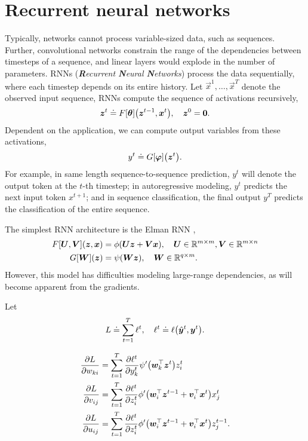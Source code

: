 \section{Recurrent neural networks}

Typically, networks cannot process variable-sized data, such as sequences. Further, convolutional
networks constrain the range of the dependencies between timesteps of a sequence, and linear layers
would explode in the number of parameters. RNNs (\textit{\textbf{R}ecurrent \textbf{N}eural
    \textbf{N}etworks}) process the data sequentially, where each timestep depends on its entire
history. Let $\vec{x}^1, \ldots, \vec{x}^T$ denote the observed input sequence, RNNs compute the
sequence of activations recursively, \[
    \vec{z}^t \doteq F[\vec{\theta}]\lft( \vec{z}^{t-1}, \vec{x}^t \rgt), \quad \vec{z}^0 = \vec{0}.
\]
Dependent on the application, we can compute output variables from these activations, \[
    y^t \doteq G[\vec{\varphi}]\lft( \vec{z}^t \rgt).
\]
For example, in same length sequence-to-sequence prediction, $y^t$ will denote the output token at
the $t$-th timestep; in autoregressive modeling, $y^t$ predicts the next input token $x^{t+1}$; and
in sequence classification, the final output $y^T$ predicts the classification of the entire
sequence.

The simplest RNN architecture is the Elman RNN \citep{elman1990finding},
\begin{align*}
    F[\bm{U}, \bm{V}](\bm{z}, \bm{x}) & = \phi(\bm{U} \bm{z} + \bm{V} \bm{x}), \quad \bm{U} \in \mathbb{R}^{m \times m}, \bm{V} \in \mathbb{R}^{m \times n} \\
    G[\bm{W}](\bm{z})                   & = \psi(\bm{W} \bm{z}), \quad \bm{W} \in \mathbb{R}^{q \times m}.
\end{align*}
However, this model has difficulties modeling large-range dependencies, as will become apparent from the gradients.

Let \[
    L \doteq \sum_{t=1}^{T} \ell^t, \quad \ell^t \doteq \ell \lft( \hat{\vec{y}}^t, \vec{y}^t \rgt).
\]

\begin{align*}
    \pdv{L}{w_{ki}} & = \sum_{t=1}^{T} \pdv{\ell^t}{y^t_k} \psi'\lft( \transpose{\vec{w}_k} \vec{z}^t \rgt) z^t_i                                             \\
    \pdv{L}{v_{ij}} & = \sum_{t=1}^{T} \pdv{\ell^t}{z^t_i} \phi' \lft( \transpose{\vec{w}}_i \vec{z}^{t-1} + \transpose{\vec{v}_i} \vec{x}^t \rgt) x_j^t      \\
    \pdv{L}{u_{ij}} & = \sum_{t=1}^{T} \pdv{\ell^t}{z^t_i} \phi' \lft( \transpose{\vec{w}}_i \vec{z}^{t-1} + \transpose{\vec{v}_i} \vec{x}^t \rgt) z_j^{t-1}.
\end{align*}

